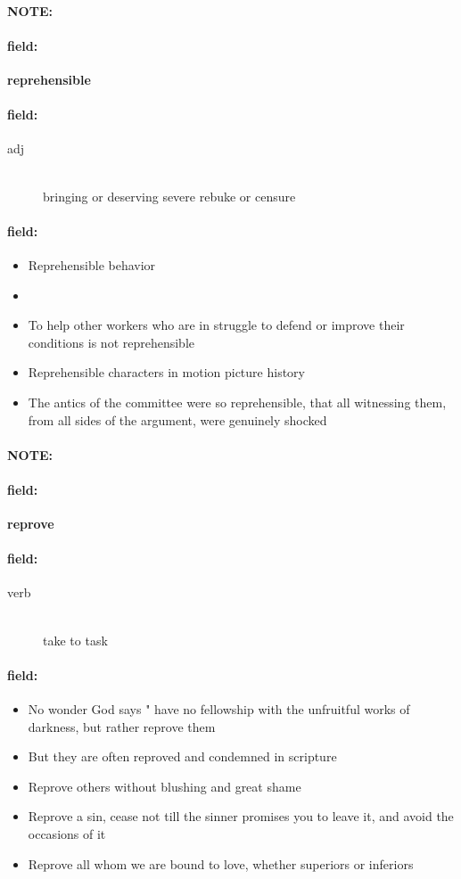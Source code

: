 \documentclass[12pt]{article}
\newenvironment{note}{\paragraph{NOTE:}}{}
\newenvironment{field}{\paragraph{field:}}{}
\begin{document}
\begin{note}
\begin{field}
\textbf{\large reprehensible}
\end{field}


\begin{field}
\begin{description}
\item[adj] \hfill \\ 
bringing or deserving severe rebuke or censure

\end{description}
\end{field}

\begin{field}
\begin{itemize}
\item Reprehensible behavior
\item 
\item To help other workers who are in struggle to defend or improve their conditions is not reprehensible
\item Reprehensible characters in motion picture history
\item The antics of the committee were so reprehensible, that all witnessing them, from all sides of the argument, were genuinely shocked
\end{itemize}
\end{field}
\end{note}
\begin{note}
\begin{field}
\textbf{\large reprove}
\end{field}


\begin{field}
\begin{description}
\item[verb] \hfill \\ 
take to task

\end{description}
\end{field}

\begin{field}
\begin{itemize}
\item No wonder God says " have no fellowship with the unfruitful works of darkness, but rather reprove them
\item But they are often reproved and condemned in scripture
\item Reprove others without blushing and great shame
\item Reprove a sin, cease not till the sinner promises you to leave it, and avoid the occasions of it
\item Reprove all whom we are bound to love, whether superiors or inferiors
\end{itemize}
\end{field}
\end{note}
\end{document}

